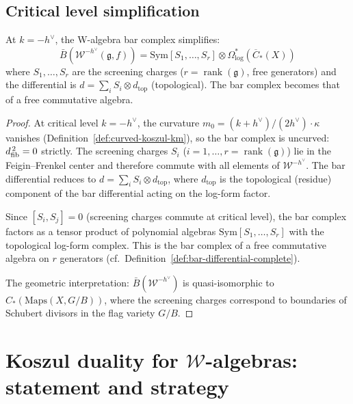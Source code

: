 \subsection{Critical level simplification}

\begin{theorem}\label{thm:w-critical-bar}
At $k = -h^\vee$, the W-algebra bar complex simplifies:
\begin{equation}
\bar{B}(\mathcal{W}^{-h^\vee}(\mathfrak{g}, f)) = \text{Sym}[S_1, \ldots, S_r] \otimes \Omega^*_{\log}(\overline{C}_*(X))
\end{equation}
where $S_1, \ldots, S_r$ are the screening charges ($r = \operatorname{rank}(\mathfrak{g})$, free generators) and the differential is $d = \sum_i S_i \otimes d_{\text{top}}$ (topological).  The bar complex becomes that of a free commutative algebra.
\end{theorem}

\begin{proof}
At critical level $k = -h^\vee$, the curvature
$m_0 = (k + h^\vee)/(2h^\vee) \cdot \kappa$ vanishes
(Definition~\ref{def:curved-koszul-km}), so the bar complex is
uncurved: $d_{\mathrm{fib}}^{\,2} = 0$ strictly.  The screening charges
$S_i$ ($i = 1, \ldots, r = \operatorname{rank}(\mathfrak{g})$)
lie in the Feigin--Frenkel center \cite{FF} and therefore commute
with all elements of $\mathcal{W}^{-h^\vee}$.  The bar differential
reduces to $d = \sum_i S_i \otimes d_{\mathrm{top}}$, where
$d_{\mathrm{top}}$ is the topological (residue) component of the
bar differential acting on the log-form factor.

Since $[S_i, S_j] = 0$ (screening charges commute at critical level),
the bar complex factors as a tensor product of polynomial algebras
$\mathrm{Sym}[S_1, \ldots, S_r]$ with the topological log-form
complex.  This is the bar complex of a free commutative
algebra on $r$ generators
(cf.\ Definition~\ref{def:bar-differential-complete}).

The geometric interpretation: $\bar{B}(\mathcal{W}^{-h^\vee})$
is quasi-isomorphic to $C_*(\mathrm{Maps}(X, G/B))$, where the
screening charges correspond to boundaries of Schubert divisors in the
flag variety $G/B$.
\end{proof}

\section{Koszul duality for $\mathcal{W}$-algebras: statement and strategy}

